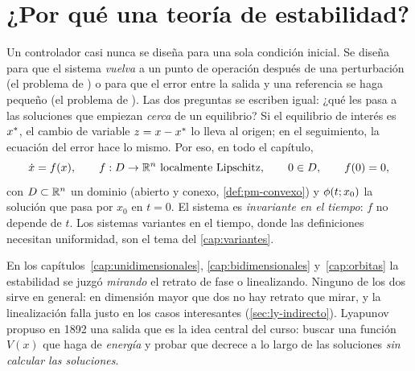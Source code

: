 \section{¿Por qué una teoría de estabilidad?}
\label{sec:ly-porque}

Un controlador casi nunca se diseña para una sola condición inicial. Se diseña para que el sistema \emph{vuelva} a un punto de operación después de una perturbación (el problema de ) o para que el error entre la salida y una referencia se haga pequeño (el problema de ). Las dos preguntas se escriben igual: ¿qué les pasa a las soluciones que empiezan \emph{cerca} de un equilibrio? Si el equilibrio de interés es $x^{*}$, el cambio de variable $z=x-x^{*}$ lo lleva al origen; en el seguimiento, la ecuación del error hace lo mismo. Por eso, en todo el capítulo,
\begin{equation}
  \dot x=f(x),\qquad f:\D\to\R^n\ \text{localmente Lipschitz},\qquad 0\in\D,\qquad f(0)=0 ,
  \label{eq:ly-sistema}
\end{equation}
con $D\subset\mathbb{R}^n$ un dominio (abierto y conexo, \cref{def:pm-convexo}) y $\phi(t;x_0)$ la solución que pasa por $x_0$ en $t=0$. El sistema es \emph{invariante en el tiempo}: $f$ no depende de $t$. Los sistemas variantes en el tiempo, donde las definiciones necesitan uniformidad, son el tema del \cref{cap:variantes}.


En los capítulos~\ref{cap:unidimensionales}, \ref{cap:bidimensionales} y~\ref{cap:orbitas} la estabilidad se juzgó \emph{mirando} el retrato de fase o linealizando. Ninguno de los dos sirve en general: en dimensión mayor que dos no hay retrato que mirar, y la linealización falla justo en los casos interesantes (\cref{sec:ly-indirecto}). Lyapunov propuso en 1892 una salida que es la idea central del curso: buscar una función $V(x)$ que haga de \emph{energía} y probar que decrece a lo largo de las soluciones \emph{sin calcular las soluciones}.

